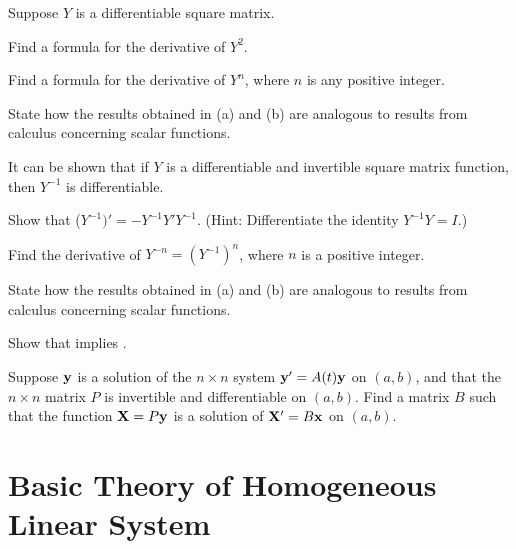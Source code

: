 \begin{exerciselist}
\item\label{exer:10.2.10}Suppose $Y$ is a differentiable square
matrix.
\begin{alist}
\item %
Find a formula for the derivative of $Y^2$.
\item %
Find a formula for the derivative of $Y^n$, where $n$ is any
positive integer.
\item %
State how the results obtained in (a) and (b) are analogous to
results from  calculus  concerning scalar functions.
\end{alist}

\item\label{exer:10.2.11}It can be shown that if $Y$ is a differentiable and  invertible
square matrix function, then $Y^{-1}$ is differentiable.

\begin{alist}
\item %
Show that ($Y^{-1})'=
-Y^{-1}Y'Y^{-1}$.
(Hint: Differentiate the identity $Y^{-1}Y=I$.)
\item %
Find the derivative of $Y^{-n}=\left(Y^{-1}\right)^n$, where $n$
is a positive integer.
\item %
State how the results obtained in (a) and (b) are analogous to
results from  calculus  concerning scalar functions.
\end{alist}

\item\label{exer:10.2.12}Show that  implies
.  

\item\label{exer:10.2.13}Suppose $\mathbf{y}$ is a solution of the $n\times n$ system  $\mathbf{y}'=A(t)\mathbf{y}$ on $(a,b)$, and that the $n\times n$ matrix $P$
is invertible and differentiable on $(a,b)$. Find a matrix $B$
such that the function $\mathbf{X}=P\mathbf{y}$ is a solution of $\mathbf{X}'=B\mathbf{x}$ on $(a,b)$.
\end{exerciselist}


\section{Basic Theory of Homogeneous Linear System}\label{sec:system_theory}

